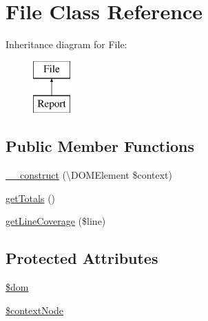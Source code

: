\hypertarget{class_sebastian_bergmann_1_1_code_coverage_1_1_report_1_1_xml_1_1_file}{}\section{File Class Reference}
\label{class_sebastian_bergmann_1_1_code_coverage_1_1_report_1_1_xml_1_1_file}
Inheritance diagram for File\+:\begin{figure}[H]
\begin{center}
\leavevmode
\includegraphics[height=2.000000cm]{class_sebastian_bergmann_1_1_code_coverage_1_1_report_1_1_xml_1_1_file}
\end{center}
\end{figure}
\subsection*{Public Member Functions}
\begin{DoxyCompactItemize}
\item 
\mbox{\hyperlink{class_sebastian_bergmann_1_1_code_coverage_1_1_report_1_1_xml_1_1_file_a3d40077fdf18089a879b71420d43633c}{\+\_\+\+\_\+construct}} (\textbackslash{}D\+O\+M\+Element \$context)
\item 
\mbox{\hyperlink{class_sebastian_bergmann_1_1_code_coverage_1_1_report_1_1_xml_1_1_file_a511f22f1ae170e06402df3b31633061a}{get\+Totals}} ()
\item 
\mbox{\hyperlink{class_sebastian_bergmann_1_1_code_coverage_1_1_report_1_1_xml_1_1_file_a380ffc8401746629874bd775148a33dc}{get\+Line\+Coverage}} (\$line)
\end{DoxyCompactItemize}
\subsection*{Protected Attributes}
\begin{DoxyCompactItemize}
\item 
\mbox{\hyperlink{class_sebastian_bergmann_1_1_code_coverage_1_1_report_1_1_xml_1_1_file_a46127a794280dd592812c25b62af34b0}{\$dom}}
\item 
\mbox{\hyperlink{class_sebastian_bergmann_1_1_code_coverage_1_1_report_1_1_xml_1_1_file_aed1c4c1718d7f9c989aecbff2b2e6de8}{\$context\+Node}}
\end{DoxyCompactItemize}


